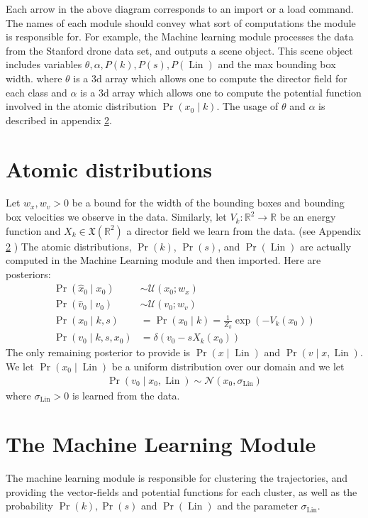 \documentclass[12pt]{amsart}
\DeclareMathOperator{\Lin}{Lin}
\begin{document}
Each arrow in the above diagram corresponds to an import or a load command.
The names of each module should convey what sort of computations the module is responsible for.
For example, the Machine learning module processes the data from the Stanford drone data set, and outputs a scene object.
This scene object includes variables $\theta, \alpha, P(k), P(s), P(\Lin)$ and the max bounding box width.
where $\theta$ is a 3d array which allows one to compute the director field for each class
and $\alpha$ is a 3d array which allows one to compute the potential function involved in the atomic distribution $\Pr( x_0 \mid k)$.
The usage of $\theta$ and $\alpha$ is described in appendix \ref{app:learning}.

\appendix

\section{Atomic distributions}
Let $w_x, w_v  > 0$ be a bound for the width of the bounding boxes and bounding box velocities we observe in the data.
Similarly, let $V_k: \mathbb{R}^2 \to \mathbb{R}$ be an energy function and $X_k \in \mathfrak{X}( \mathbb{R}^2)$ a director field we learn from the data. (see Appendix \ref{app:learning} )
The atomic distributions, $\Pr(k)$, $\Pr(s)$, and $\Pr(\Lin)$ are actually computed in the Machine Learning module and then imported.
Here are posteriors:
\begin{align*}
	\Pr( \hat{x}_0 \mid x_0 ) &\sim \mathcal{U}( x_0 ; w_x ) \\
	\Pr( \hat{v}_0 \mid v_0 ) &\sim \mathcal{U}( v_0 ; w_v ) \\
	\Pr( x_0 \mid k,s ) &= \Pr(x_0 \mid k) = \frac{1}{Z_k} \exp \left( -V_k( x_0 ) \right) \\
	\Pr( v_0 \mid k,s,x_0) &= \delta( v_0 - s X_k(x_0) )
\end{align*}
The only remaining posterior to provide is $\Pr( x \mid \Lin )$ and $\Pr( v \mid x,\Lin )$.
We let $\Pr( x_0 \mid \Lin)$ be a uniform distribution over our domain and we let
\begin{align}
	\Pr( v_0 \mid x_0 , \Lin ) \sim \mathcal{N}( x_0, \sigma_{\Lin} ) \label{eq:v given x and Linear}
\end{align}
where $\sigma_{\Lin} > 0$ is learned from the data.

\section{The Machine Learning Module}
\label{app:learning}
The machine learning module is responsible for clustering the trajectories, and providing the vector-fields and potential functions for each cluster, as well as the probability $\Pr(k), \Pr(s)$ and $\Pr( \Lin)$ and the parameter $\sigma_{\Lin}$.
\end{document}
